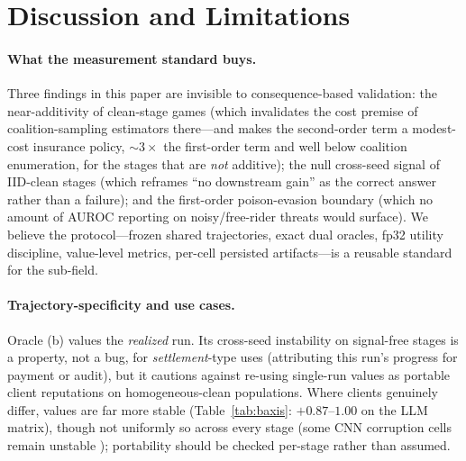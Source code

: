 \section{Discussion and Limitations}
\label{sec:limitations}

\paragraph{What the measurement standard buys.}
Three findings in this paper are invisible to consequence-based validation:
the near-additivity of clean-stage games (which invalidates the cost premise of
coalition-sampling estimators there---and makes the second-order term a
modest-cost insurance policy, $\sim$$3\times$ the first-order term and well
below coalition enumeration, for the stages that are \emph{not} additive); the
null cross-seed signal of IID-clean stages (which reframes ``no downstream
gain'' as the correct answer rather than a failure); and the first-order
poison-evasion boundary (which no amount of AUROC reporting on noisy/free-rider
threats would surface). We believe the protocol---frozen shared trajectories,
exact dual oracles, fp32 utility discipline, value-level metrics, per-cell
persisted artifacts---is a reusable standard for the sub-field.

\paragraph{Trajectory-specificity and use cases.}
Oracle (b) values the \emph{realized} run. Its cross-seed instability on
signal-free stages is a property, not a bug, for \emph{settlement}-type uses
(attributing this run's progress for payment or audit), but it cautions against
re-using single-run values as portable client reputations on homogeneous-clean
populations. Where clients genuinely differ, values are far more stable
(Table~\ref{tab:baxis}: $+0.87$--$1.00$ on the LLM matrix), though not
uniformly so across every stage (some CNN corruption cells remain unstable
); portability should be checked
per-stage rather than assumed.

